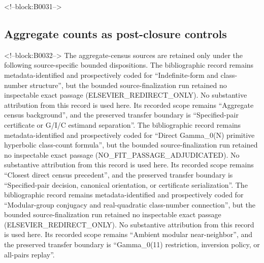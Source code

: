 \documentclass[11pt]{article}
\begin{document}
<!--block:B0031-->
\hypertarget{24-aggregate-counts-as-post-closure-controls}{%
\subsection{Aggregate counts as post-closure
controls}\label{24-aggregate-counts-as-post-closure-controls}}

<!--block:B0032-->
The aggregate-census sources are retained only under the following source-specific bounded dispositions.
The bibliographic record \citep{P31-S14} remains metadata-identified and
prospectively coded for ``Indefinite-form and class-number structure'', but the bounded source-finalization
run retained no inspectable exact passage (ELSEVIER\_REDIRECT\_ONLY).  No substantive
attribution from this record is used here.  Its recorded scope remains
``Aggregate census background'', and the preserved transfer boundary is ``Specified-pair certificate or G/I/C estimand separation''.
The bibliographic record \citep{P31-S21} remains metadata-identified and
prospectively coded for ``Direct Gamma\_0(N) primitive hyperbolic class-count formula'', but the bounded source-finalization
run retained no inspectable exact passage (NO\_FIT\_PASSAGE\_ADJUDICATED).  No substantive
attribution from this record is used here.  Its recorded scope remains
``Closest direct census precedent'', and the preserved transfer boundary is ``Specified-pair decision, canonical orientation, or certificate serialization''.
The bibliographic record \citep{P31-S22} remains metadata-identified and
prospectively coded for ``Modular-group conjugacy and real-quadratic class-number connection'', but the bounded source-finalization
run retained no inspectable exact passage (ELSEVIER\_REDIRECT\_ONLY).  No substantive
attribution from this record is used here.  Its recorded scope remains
``Ambient modular near-neighbor'', and the preserved transfer boundary is ``Gamma\_0(11) restriction, inversion policy, or all-pairs replay''.
\end{document}
